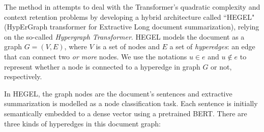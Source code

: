 \documentclass[preprint,review,10pt]{elsarticle}
\begin{document}
	The method in \cite{hegel} attempts to deal with the Transformer's quadratic complexity and context retention problems by developing a hybrid architecture called ``HEGEL" (HypErGraph transformer for Extractive Long document summarization), relying on the so-called \textit{Hypergraph Transformer}. HEGEL models the document as a graph $G = (V, E)$, where $V$ is a set of nodes and $E$ a set of \textit{hyperedges}: an edge that can connect two \textit{or more} nodes. We use the notations $u \in e$ and $u \notin e$ to represent whether a node is connected to a hyperedge in graph $G$ or not, respectively.
	
	In HEGEL, the graph nodes are the document's sentences and extractive summarization is modelled as a node classification task. Each sentence is initially semantically embedded to a dense vector using a pretrained BERT. There are three kinds of hyperedges in this document graph:
\end{document}

